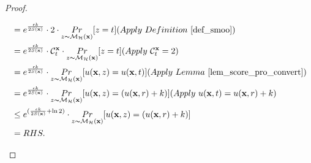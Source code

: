 \documentclass{article}
\begin{document}
\begin{proof}
\begin{itemize}
\begin{itemize}
\begin{equation*}
\begin{split}
      & = e^{\frac{\epsilon k}{2 S(\dataobs)}} \cdot 2 \cdot \hexpmechPr{\dataobs}{z = t}                                 (Apply\ Definition\ \ref{def_smoo})\\
      & = e^{\frac{\epsilon k}{2 S(\dataobs)}} \cdot \cardinality{\dataobs}{t} \cdot \hexpmechPr{\dataobs}{z = t}         (Apply \ \cardinality{\dataobs}{t} = 2)\\
      & = e^{\frac{\epsilon k}{2 S(\dataobs)}} \cdot \hexpmechPr{\dataobs}{\ux{z} = \ux{t}}                               (Apply \ Lemma\ \ref{lem_score_pro_convert})\\
      & = e^{\frac{\epsilon k}{2 S(\dataobs)}} \cdot \hexpmechPr{\dataobs}{\ux{z} = (\ux{r} + k)}                         (Apply \ \ux{t} = \ux{r} + k)\\
      & \leq e^{(\frac{\epsilon k}{2 S(\dataobs)} + \ln 2)} \cdot \hexpmechPr{\dataobs}{\ux{z} = (\ux{r} + k)}\\
      & = RHS.
      \end{split}
      \end{equation*}


\end{itemize}
\end{itemize}
\end{proof}
\end{document}

